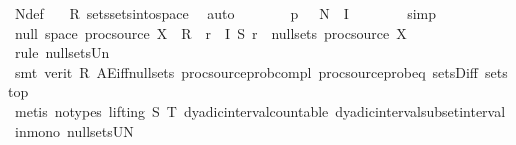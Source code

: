 \begin{isabellebody}
\ N{\isacharunderscore}{\kern0pt}def\ \isamarkupfalse%
\ {\isacharasterisk}{\kern0pt}\ R{\isacharparenleft}{\kern0pt}{}{\isacharparenright}{\kern0pt}\ sets{\isachardot}{\kern0pt}sets{\isacharunderscore}{\kern0pt}into{\isacharunderscore}{\kern0pt}space\ \isamarkupfalse%
\ auto\isanewline
\ \ \ \ \isamarkupfalse%
\ \isamarkupfalse%
\ {\isachardoublequoteopen}p\ {\isasymin}\ {\isasymUnion}\ {\isacharparenleft}{\kern0pt}N\ {\isacharbackquote}{\kern0pt}\ {\isacharquery}{\kern0pt}I{\isacharparenright}{\kern0pt}{\isachardoublequoteclose}\isanewline
\ \ \ \ \ \ \isamarkupfalse%
\ simp\isanewline
\ \ \isamarkupfalse%
\isanewline
\ \ \isamarkupfalse%
\ null{\isacharcolon}{\kern0pt}\ {\isachardoublequoteopen}{\isacharparenleft}{\kern0pt}space\ {\isacharparenleft}{\kern0pt}proc{\isacharunderscore}{\kern0pt}source\ X{\isacharparenright}{\kern0pt}\ {\isacharminus}{\kern0pt}\ R{\isacharparenright}{\kern0pt}\ {\isasymunion}\ {\isacharparenleft}{\kern0pt}{\isasymUnion}r\ {\isasymin}\ {\isacharquery}{\kern0pt}I{\isachardot}{\kern0pt}\ S\ r{\isacharparenright}{\kern0pt}\ {\isasymin}\ null{\isacharunderscore}{\kern0pt}sets\ {\isacharparenleft}{\kern0pt}proc{\isacharunderscore}{\kern0pt}source\ X{\isacharparenright}{\kern0pt}{\isachardoublequoteclose}\isanewline
\ \ \ \ \isamarkupfalse%
\ {\isacharparenleft}{\kern0pt}rule\ null{\isacharunderscore}{\kern0pt}sets{\isachardot}{\kern0pt}Un{\isacharparenright}{\kern0pt}\isanewline
\ \ \ \ \ \isamarkupfalse%
\ {\isacharparenleft}{\kern0pt}smt\ {\isacharparenleft}{\kern0pt}verit{\isacharparenright}{\kern0pt}\ R{\isacharparenleft}{\kern0pt}{}{\isacharcomma}{\kern0pt}{}{\isacharparenright}{\kern0pt}\ AE{\isacharunderscore}{\kern0pt}iff{\isacharunderscore}{\kern0pt}null{\isacharunderscore}{\kern0pt}sets\ proc{\isacharunderscore}{\kern0pt}source{\isachardot}{\kern0pt}prob{\isacharunderscore}{\kern0pt}compl\ proc{\isacharunderscore}{\kern0pt}source{\isachardot}{\kern0pt}prob{\isacharunderscore}{\kern0pt}eq{\isacharunderscore}{\kern0pt}{}\ sets{\isachardot}{\kern0pt}Diff\ sets{\isachardot}{\kern0pt}top{\isacharparenright}{\kern0pt}\isanewline
\ \ \ \ \isamarkupfalse%
\ {\isacharparenleft}{\kern0pt}metis\ {\isacharparenleft}{\kern0pt}no{\isacharunderscore}{\kern0pt}types{\isacharcomma}{\kern0pt}\ lifting{\isacharparenright}{\kern0pt}\ S\ T{\isacharparenleft}{\kern0pt}{}{\isacharparenright}{\kern0pt}\ dyadic{\isacharunderscore}{\kern0pt}interval{\isacharunderscore}{\kern0pt}countable\ dyadic{\isacharunderscore}{\kern0pt}interval{\isacharunderscore}{\kern0pt}subset{\isacharunderscore}{\kern0pt}interval\ in{\isacharunderscore}{\kern0pt}mono\ null{\isacharunderscore}{\kern0pt}sets{\isacharunderscore}{\kern0pt}UN{\isacharprime}{\kern0pt}{\isacharparenright}{\kern0pt}\isanewline

\end{isabellebody}
